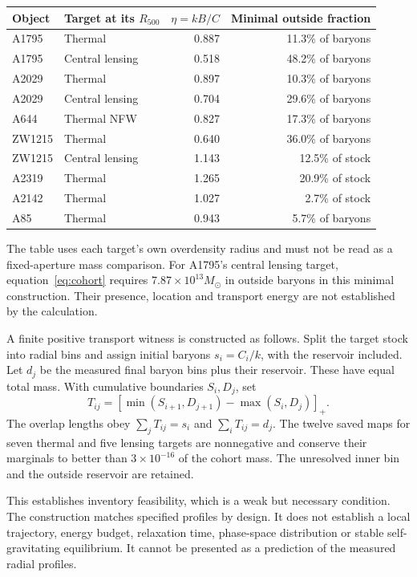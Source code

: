 \documentclass[11pt]{article}
\begin{document}
\begin{center}\small
\begin{tabular}{llrr}
\toprule
Object & Target at its $R_{500}$ & $\eta=kB/C$ & Minimal outside fraction\\
\midrule
A1795 & Thermal & 0.887 & 11.3\% of baryons\\
A1795 & Central lensing & 0.518 & 48.2\% of baryons\\
A2029 & Thermal & 0.897 & 10.3\% of baryons\\
A2029 & Central lensing & 0.704 & 29.6\% of baryons\\
A644 & Thermal NFW & 0.827 & 17.3\% of baryons\\
ZW1215 & Thermal & 0.640 & 36.0\% of baryons\\
ZW1215 & Central lensing & 1.143 & 12.5\% of stock\\
A2319 & Thermal & 1.265 & 20.9\% of stock\\
A2142 & Thermal & 1.027 & 2.7\% of stock\\
A85 & Thermal & 0.943 & 5.7\% of baryons\\
\bottomrule
\end{tabular}
\end{center}

The table uses each target's own overdensity radius and must not be read as a fixed-aperture mass comparison. For A1795's central lensing target, equation~\eqref{eq:cohort} requires $7.87\times10^{13}M_\odot$ in outside baryons in this minimal construction. Their presence, location and transport energy are not established by the calculation.

A finite positive transport witness is constructed as follows. Split the target stock into radial bins and assign initial baryons $s_i=C_i/k$, with the reservoir included. Let $d_j$ be the measured final baryon bins plus their reservoir. These have equal total mass. With cumulative boundaries $S_i,D_j$, set
\[
T_{ij}=\left[\min(S_{i+1},D_{j+1})-\max(S_i,D_j)\right]_+.
\]
The overlap lengths obey $\sum_jT_{ij}=s_i$ and $\sum_iT_{ij}=d_j$. The twelve saved maps for seven thermal and five lensing targets are nonnegative and conserve their marginals to better than $3\times10^{-16}$ of the cohort mass. The unresolved inner bin and the outside reservoir are retained.

This establishes inventory feasibility, which is a weak but necessary condition. The construction matches specified profiles by design. It does not establish a local trajectory, energy budget, relaxation time, phase-space distribution or stable self-gravitating equilibrium. It cannot be presented as a prediction of the measured radial profiles.
\end{document}
